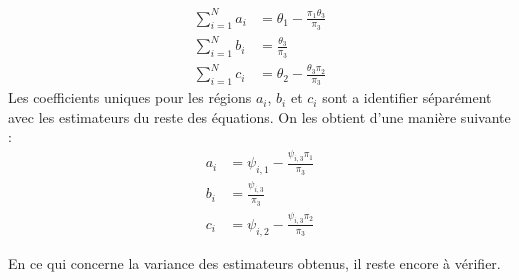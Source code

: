 \documentclass[11pt, a4paper]{article}
\begin{document}
\begin{align}
  \sum_{i = 1}^{N} a_i & = \theta_1 - \frac{\pi_1 \theta_3}{\pi_3} \\
  \sum_{i = 1}^{N} b_i & = \frac{\theta_3}{\pi_3} \\
  \sum_{i = 1}^{N} c_i & = \theta_2 - \frac{\theta_3 \pi_2}{\pi_3}
\end{align}
Les coefficients uniques pour les régions $a_i$, $b_i$ et $c_i$ sont a identifier séparément avec les estimateurs du reste des équations.
On les obtient d'une manière suivante :
\begin{align}
  a_i & = \psi_{i,1} - \frac{\psi_{i,3} \pi_1}{\pi_3} \\
  b_i & = \frac{\psi_{i,3}}{\pi_3} \\
  c_i & = \psi_{i,2} - \frac{\psi_{i,3} \pi_2}{\pi_3}
\end{align}
\par
En ce qui concerne la variance des estimateurs obtenus, il reste encore à vérifier.
\end{document}

